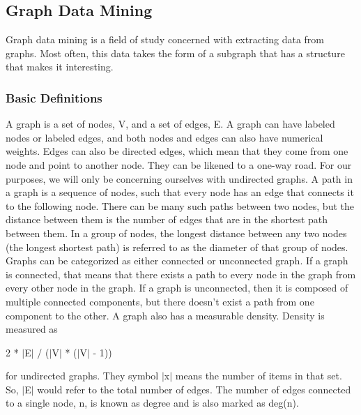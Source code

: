 \documentclass[12pt]{article}
\begin{document}
\subsection{Graph Data Mining}
Graph data mining is a field of study concerned with extracting data from graphs. Most often, this data takes the form of a subgraph that has a structure that makes it interesting.

\subsubsection{Basic Definitions}
A graph is a set of nodes, V, and a set of edges, E. A graph can have labeled nodes or labeled edges, and both nodes and edges can also have numerical weights. Edges can also be directed edges, which mean that they come from one node and point to another node. They can be likened to a one-way road. For our purposes, we will only be concerning ourselves with undirected graphs.
\newline\newline
A path in a graph is a sequence of nodes, such that every node has an edge that connects it to the following node. There can be many such paths between two nodes, but the distance between them is the number of edges that are in the shortest path between them. In a group of nodes, the longest distance between any two nodes (the longest shortest path) is referred to as the diameter of that group of nodes.
\newline\newline
Graphs can be categorized as either connected or unconnected graph. If a graph is connected, that means that there exists a path to every node in the graph from every other node in the graph. If a graph is unconnected, then it is composed of multiple connected components, but there doesn't exist a path from one component to the other.
\newline\newline
A graph also has a measurable density. Density is measured as
\newline\newline
\centerline{2 * $\vert$E$\vert$ / ($\vert$V$\vert$ * ($\vert$V$\vert$ - 1))}
\newline\newline
for undirected graphs. They symbol $\vert$x$\vert$ means the number of items in that set. So, $\vert$E$\vert$ would refer to the total number of edges. The number of edges connected to a single node, n, is known as degree and is also marked as deg(n).
\end{document}
